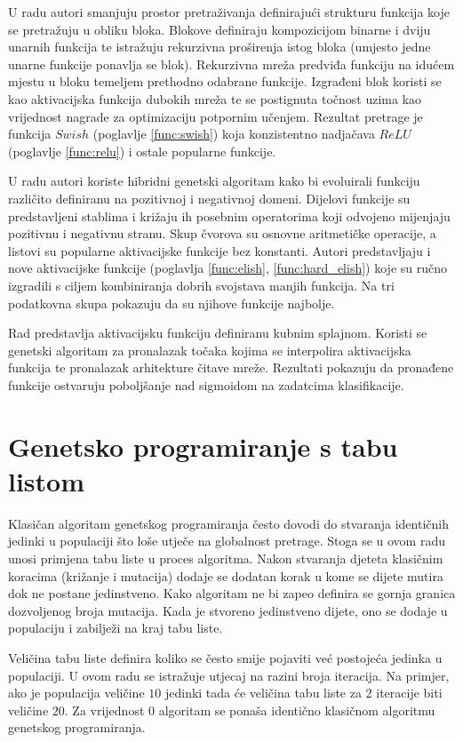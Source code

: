\documentclass[times, utf8, numeric, diplomski]{fer}
\def\secref#1{(poglavlje \ref{#1})}
\begin{document}
U radu \citet{swish} autori smanjuju prostor pretraživanja definirajući strukturu funkcija koje se pretražuju u obliku bloka. Blokove definiraju kompozicijom binarne i dviju unarnih funkcija te istražuju rekurzivna proširenja istog bloka (umjesto jedne unarne funkcije ponavlja se blok). Rekurzivna mreža predviđa funkciju na idućem mjestu u bloku temeljem prethodno odabrane funkcije. Izgrađeni blok koristi se kao aktivacijska funkcija dubokih mreža te se postignuta točnost uzima kao vrijednost nagrade za optimizaciju potpornim učenjem. Rezultat pretrage je funkcija $Swish$ \secref{func:swish} koja konzistentno nadjačava $ReLU$ \secref{func:relu} i ostale popularne funkcije.

U radu \citet{elish} autori koriste hibridni genetski algoritam kako bi evoluirali funkciju različito definiranu na pozitivnoj i negativnoj domeni. Dijelovi funkcije su predstavljeni stablima i križaju ih posebnim operatorima koji odvojeno mijenjaju pozitivnu i negativnu stranu. Skup čvorova su osnovne aritmetičke operacije, a listovi su popularne aktivacijske funkcije bez konstanti. Autori predstavljaju i nove aktivacijske funkcije (poglavlja \ref{func:elish}, \ref{func:hard_elish}) koje su ručno izgradili s ciljem kombiniranja dobrih svojstava manjih funkcija. Na tri podatkovna skupa pokazuju da su njihove funkcije najbolje.

Rad \citet{cube_spline_func} predstavlja aktivacijsku funkciju definiranu kubnim splajnom. Koristi se genetski algoritam za pronalazak točaka kojima se interpolira aktivacijska funkcija te pronalazak arhitekture čitave mreže. Rezultati pokazuju da pronađene funkcije ostvaruju poboljšanje nad sigmoidom na zadatcima klasifikacije.

\section{Genetsko programiranje s tabu listom}
Klasičan algoritam genetskog programiranja često dovodi do stvaranja identičnih jedinki u populaciji što loše utječe na globalnost pretrage. Stoga se u ovom radu unosi primjena tabu liste u proces algoritma. Nakon stvaranja djeteta klasičnim koracima (križanje i mutacija) dodaje se dodatan korak u kome se dijete mutira dok ne postane jedinstveno. Kako algoritam ne bi zapeo definira se gornja granica dozvoljenog broja mutacija. Kada je stvoreno jedinstveno dijete, ono se dodaje u populaciju i zabilježi na kraj tabu liste.

Veličina tabu liste definira koliko se često smije pojaviti već postojeća jedinka u populaciji. U ovom radu se istražuje utjecaj na razini broja iteracija. Na primjer, ako je populacija veličine $10$ jedinki tada će veličina tabu liste za $2$ iteracije biti veličine $20$. Za vrijednost $0$ algoritam se ponaša identično klasičnom algoritmu genetskog programiranja.
\end{document}
